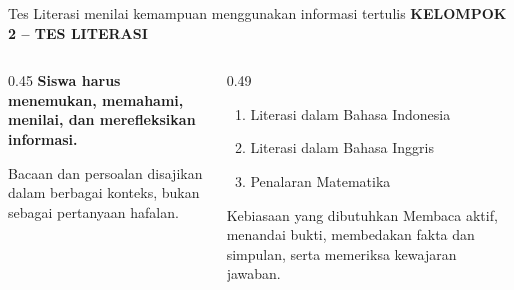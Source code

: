 \documentclass[aspectratio=169,11pt]{beamer}
\newcommand{\kicker}[1]{%
  {\color{StudentCyan}\bfseries\fontsize{10.5}{13}\selectfont\MakeUppercase{#1}}\par\vspace{0.11cm}
}
\newcommand{\claim}[1]{%
  {\color{StudentNavy}\bfseries\fontsize{18}{22}\selectfont #1}\par
}
\begin{document}
\begin{frame}{Tes Literasi menilai kemampuan menggunakan informasi tertulis}
  \kicker{Kelompok 2 -- Tes Literasi}
  \begin{columns}[T,onlytextwidth]
    \begin{column}{0.45\textwidth}
      \claim{Siswa harus menemukan, memahami, menilai, dan merefleksikan informasi.}
      \vspace{0.20cm}
      {\fontsize{11.8}{14.8}\selectfont Bacaan dan persoalan disajikan dalam berbagai konteks, bukan sebagai pertanyaan hafalan.}
    \end{column}
    \begin{column}{0.49\textwidth}
      \begin{enumerate}
        \item Literasi dalam Bahasa Indonesia
        \item Literasi dalam Bahasa Inggris
        \item Penalaran Matematika
      \end{enumerate}
      \vspace{0.22cm}
      \begin{block}{Kebiasaan yang dibutuhkan}
        Membaca aktif, menandai bukti, membedakan fakta dan simpulan, serta memeriksa kewajaran jawaban.
      \end{block}
    \end{column}
  \end{columns}
\end{frame}
\end{document}
